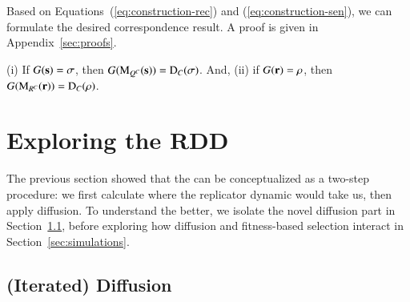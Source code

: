 \documentclass[fleqn,reqno,10pt]{article}
\renewcommand{\Smixed}{\ensuremath{\mathrm{\mathbf{s}}}}
\renewcommand{\Rmixed}{\ensuremath{\mathrm{\mathbf{r}}}}
\newcommand{\rdd}{\acro{rdd}} %
\newcommand{\Diff}{\ensuremath{\mathrm{D}}} %
\newcommand{\Mutate}{\ensuremath{\mathrm{M}}} %
\begin{document}
Based on Equations~(\ref{eq:construction-rec}) and
(\ref{eq:construction-sen}), we can formulate the desired
correspondence result. A proof is given in Appendix~\ref{sec:proofs}.

\begin{theorem}
  \label{thm:Correspondence}
  (i) If $G(\Smixed) = \Sstrat$, then $G(\Mutate_{Q^C}(\Smixed)) =
  \Diff_C(\Sstrat)$. And, (ii) if $G(\Rmixed) = \Rstrat$, then
  $G(\Mutate_{R^C}(\Rmixed)) = \Diff_C(\Rstrat)$.
\end{theorem}



\section{Exploring the RDD}
\label{sec:exploring-rdd}

The previous section showed that the \rdd can be conceptualized as a
two-step procedure: we first calculate where the replicator dynamic
would take us, then apply diffusion. To understand the \rdd better, we
isolate the novel diffusion part in
Section~\ref{sec:iterated-diffusion}, before exploring how diffusion
and fitness-based selection interact in Section~\ref{sec:simulations}.

\subsection{(Iterated) Diffusion}
\label{sec:iterated-diffusion}
\end{document}
